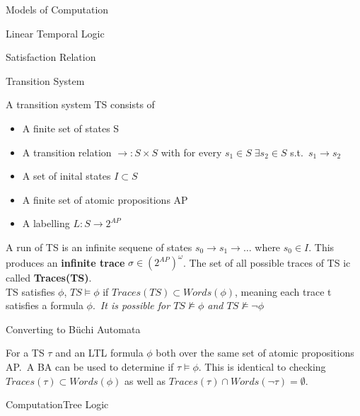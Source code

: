 \documentclass[12pt, letterpaper]{article}
\begin{document}
\begin{section}{Models of Computation}
\begin{subsection}{Linear Temporal Logic}
\begin{subsubsection}{Satisfaction Relation}
    \end{subsubsection}

    \begin{subsubsection}{Transition System}

      A transition system TS consists of
      \begin{itemize}
        \item A finite set of states S
        \item A transition relation \(\to : S \times S\) with for every
        \(s_{1} \in S \; \exists s_{2} \in S\) s.t.\ \(s_{1} \to s_{2}\)
        \item A set of inital states \(I \subset S\)
        \item A finite set of atomic propositions AP
        \item A labelling \(L: S \to 2^{AP}\)
      \end{itemize}

      A run of TS is an infinite sequene of states \(s_{0} \to s_{1} \to \dots\)
      where \(s_{0} \in I\). This produces an \textbf{infinite trace}
      \(\sigma \in (2^{AP})^{\omega}\). The set of all possible traces of TS ic
      called \textbf{Traces(TS)}. \\
      TS satisfies \(\phi\), \(TS \models \phi\) if
      \(Traces(TS) \subset Words(\phi)\), meaning each trace t satisfies a
      formula \(\phi\).\ \emph{It is possible for \(TS \not \models \phi\) and
      \(TS \not \models \lnot \phi\)}

    \end{subsubsection}

    \begin{subsubsection}{Converting to B\"uchi Automata}

      For a TS \(\tau\) and an LTL formula \(\phi\) both over the same set of
      atomic propositions AP.\ A BA can be used to determine if
      \(\tau \models \phi\). This is identical to checking \(Traces(\tau) \subset
      Words(\phi)\) as well as \(Traces(\tau) \cap Words(\lnot \tau) = \emptyset\).


    \end{subsubsection}

  \end{subsection}

  \begin{subsection}{ComputationTree Logic}


\end{subsection}
\end{section}
\end{document}
